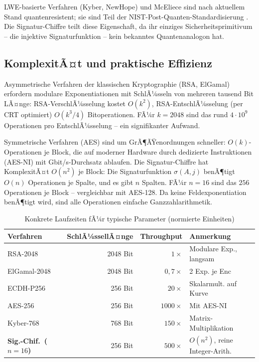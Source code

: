 ﻿\documentclass[a4paper,12pt]{scrreprt}
\theoremstyle{definition}
\begin{document}
LWE-basierte Verfahren (Kyber, NewHope) und McEliece sind nach aktuellem Stand quantenresistent; sie sind Teil der NIST-Post-Quanten-Standardisierung \cite{NIST22}. Die Signatur-Chiffre teilt diese Eigenschaft, da ihr einziges Sicherheitsprimitivum -- die injektive Signaturfunktion -- kein bekanntes Quantenanalogon hat.

\subsection{KomplexitÃ¤t und praktische Effizienz}

Asymmetrische Verfahren der klassischen Kryptographie (RSA, ElGamal) erfordern modulare Exponentiationen mit SchlÃ¼sseln von mehreren tausend Bit LÃ¤nge: RSA-VerschlÃ¼sselung kostet $O(k^2)$, RSA-EntschlÃ¼sselung (per CRT optimiert) $O(k^3/4)$ Bitoperationen. FÃ¼r $k=2048$ sind das rund $4\cdot10^9$ Operationen pro EntschlÃ¼sselung -- ein signifikanter Aufwand.

Symmetrische Verfahren (AES) sind um GrÃ¶ÃŸenordnungen schneller: $O(k)$-Operationen je Block, die auf moderner Hardware durch dedizierte Instruktionen (AES-NI) mit Gbit/s-Durchsatz ablaufen. Die Signatur-Chiffre hat KomplexitÃ¤t $O(n^2)$ je Block: Die Signaturfunktion $\sigma(A,j)$ benÃ¶tigt $O(n)$ Operationen je Spalte, und es gibt $n$ Spalten. FÃ¼r $n=16$ sind das $256$ Operationen je Block -- vergleichbar mit AES-128. Da keine Feldexponentiation benÃ¶tigt wird, sind alle Operationen einfache Ganzzahlarithmetik.

\begin{table}[H]
\centering
\caption{Konkrete Laufzeiten fÃ¼r typische Parameter (normierte Einheiten)}
\label{tab:laufzeit}
\begin{tabular}{@{}lrrl@{}}
\toprule
\textbf{Verfahren} & \textbf{SchlÃ¼ssellÃ¤nge} & \textbf{Throughput} & \textbf{Anmerkung} \\
\midrule
RSA-2048              & 2048 Bit  & $1\times$      & Modulare Exp., langsam \\
ElGamal-2048          & 2048 Bit  & $0{,}7\times$  & 2 Exp. je Enc \\
ECDH-P256             & 256 Bit   & $20\times$     & Skalarmult. auf Kurve \\
AES-256               & 256 Bit   & $1000\times$   & Mit AES-NI \\
Kyber-768             & 768 Bit   & $150\times$    & Matrix-Multiplikation \\
\textbf{Sig.-Chif.\ ($n=16$)} & 256 Bit & $500\times$ & $O(n^2)$, reine Integer-Arith. \\
\bottomrule
\end{tabular}
\end{table}
\end{document}
